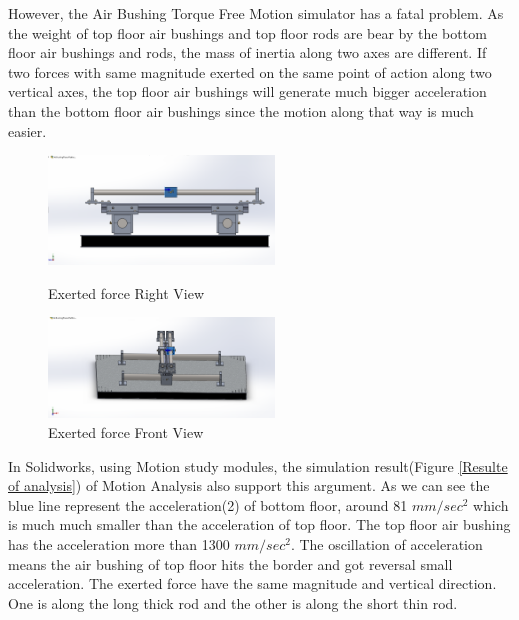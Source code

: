 However, the Air Bushing Torque Free Motion simulator has a fatal problem. As the weight of top floor air bushings and top floor rods are bear by the bottom floor air bushings and rods, the mass of inertia along two axes are different. If two forces with same magnitude exerted on the same point of action along two vertical axes, the top floor air bushings will generate much bigger acceleration than the bottom floor air bushings since the motion along that way is much easier.


\begin{figure}[H]
\centering
\begin{minipage}[t]{0.48\textwidth}
\centering
\includegraphics[width = 6cm]{fig/DOE/Rightforce}
\caption{Exerted force Right View}
\end{minipage}
\begin{minipage}[t]{0.48\textwidth}
\centering
\includegraphics[width = 6cm]{fig/DOE/ForwardForce}
\caption{Exerted force Front View}\label{DOE-force}
\end{minipage}
\end{figure}


In Solidworks, using Motion study modules, the simulation result(Figure \ref{Resulte of analysis}) of Motion Analysis also support this argument. As we can see the blue line represent the acceleration(2) of bottom floor, around 81 $mm/sec^2$ which is much much smaller than the acceleration of top floor. The top floor air bushing has the acceleration more than 1300 $mm/sec^2$. The oscillation of acceleration means the air bushing of top floor hits the border and got reversal small acceleration. The exerted force have the same magnitude and vertical direction. One is along the long thick rod and the other is along the short thin rod.


